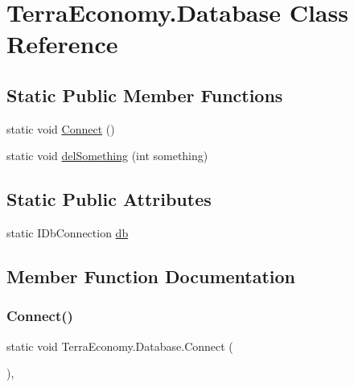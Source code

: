 \hypertarget{class_terra_economy_1_1_database}{}\section{Terra\+Economy.\+Database Class Reference}
\label{class_terra_economy_1_1_database}
\subsection*{Static Public Member Functions}
\begin{DoxyCompactItemize}
\item 
static void \hyperlink{class_terra_economy_1_1_database_a03155276ec79e9aeba88bb7df3edcb4d}{Connect} ()
\item 
static void \hyperlink{class_terra_economy_1_1_database_a007912559f4aae3ac46bf61226c7ce61}{del\+Something} (int something)
\end{DoxyCompactItemize}
\subsection*{Static Public Attributes}
\begin{DoxyCompactItemize}
\item 
static I\+Db\+Connection \hyperlink{class_terra_economy_1_1_database_a2290bf1e9dc5cd26715ef001c8e119df}{db}
\end{DoxyCompactItemize}


\subsection{Member Function Documentation}
\mbox{\label{class_terra_economy_1_1_database_a03155276ec79e9aeba88bb7df3edcb4d}} 
\subsubsection{\texorpdfstring{Connect()}{Connect()}}
{\footnotesize\ttfamily static void Terra\+Economy.\+Database.\+Connect (\begin{DoxyParamCaption}{ }\end{DoxyParamCaption})\hspace{0.3cm}{\ttfamily [inline]}, {\ttfamily [static]}}

